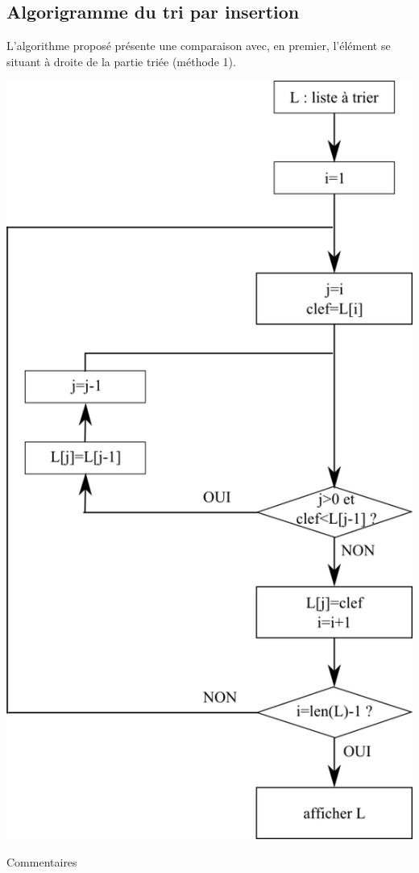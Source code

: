 \documentclass[t,11pt]{article}
\begin{document}
\subsection{Algorigramme du tri par insertion}

L'algorithme proposé présente une comparaison avec, en premier, l'élément se situant à droite de la partie triée (méthode 1).

\begin{minipage}{.45\textwidth}%
\begin{center}
\includegraphics[width=1\textwidth]{images/algorigramme_insertion.png}
\end{center}
\end{minipage}%
\hfill
\begin{minipage}{.5\textwidth}%
\vspace*{0.6cm}
\begin{python}
Commentaires
\vspace*{13cm}
\end{python}
\end{minipage}
\end{document}
